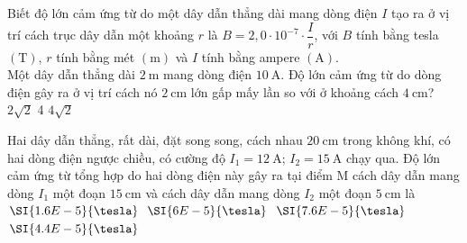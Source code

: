 \begin{ex}
	Biết độ lớn cảm ứng từ do một dây dẫn thẳng dài mang dòng điện $I$ tạo ra ở vị trí cách trục dây dẫn một khoảng $r$ là $B=2,0 \cdot 10^{-7}\cdot \dfrac{I}{r}$, với $B$ tính bằng tesla $\left(\si{\tesla}\right)$, $r$ tính bằng mét $\left(\si{\meter}\right)$ và $I$ tính bằng ampere $\left(\si{\ampere}\right)$.\\
	Một dây dẫn thẳng dài $\SI{2}{\meter}$ mang dòng điện $\SI{10}{\ampere}$. Độ lớn cảm ứng từ do dòng điện gây ra ở vị trí cách nó $\SI{2}{\centi\meter}$ lớn gấp mấy lần so với ở khoảng cách $\SI{4}{\centi\meter}$?
	\choice
	{}
	{$2 \sqrt{2}$}
	{4}
	{$4 \sqrt{2}$}
\end{ex}
\begin{ex}
Hai dây dẫn thẳng, rất dài, đặt song song, cách nhau $\SI{20}{\centi\meter}$ trong không khí, có hai dòng điện ngược chiều, có cường độ $I_1 =\SI{12}{\ampere}$; $I_2 =\SI{15}{\ampere}$ chạy qua. Độ lớn cảm ứng từ tổng hợp do hai dòng điện này gây ra tại điểm M cách dây dẫn mang dòng $I_1$ một đoạn $\SI{15}{\centi\meter}$ và cách dây dẫn mang dòng $I_2$ một đoạn $\SI{5}{\centi\meter}$ là
	\choice
	{$\SI{1.6E-5}{\tesla}$}
	{$\SI{6E-5}{\tesla}$}
	{\True $\SI{7.6E-5}{\tesla}$}
	{$\SI{4.4E-5}{\tesla}$}
\end{ex}
